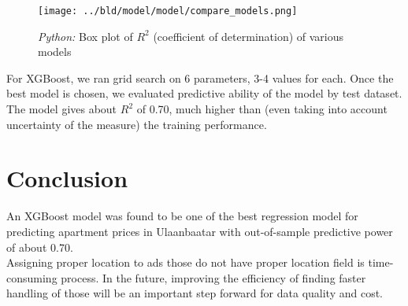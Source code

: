 \documentclass[11pt, a4paper, leqno]{article}
\begin{document}
\begin{frame}[t]
    \begin{figure}[H]
        \centering
        \texttt{[image: ../bld/model/model/compare\_models.png]}
        \caption{\emph{Python:} Box plot of $R^{2}$ (coefficient of determination) of various models}
        \label{fig:loc_price}
    \end{figure}
\end{frame}



For XGBoost, we ran grid search on 6 parameters, 3-4 values for each. Once the best model is chosen, we evaluated predictive ability of the
model by test dataset. The model gives about $R^{2}$ of 0.70, much higher than (even taking into account uncertainty of the measure) the
training performance.

\section{Conclusion} %
\label{sec:conclusion}

An XGBoost model was found to be one of the best regression model for predicting apartment prices in Ulaanbaatar with out-of-sample
predictive power of about 0.70. \\

Assigning proper location to ads those do not have proper location field is time-consuming process. In the future, improving
the efficiency of finding faster handling of those will be an important step forward for data quality and cost.
\end{document}
